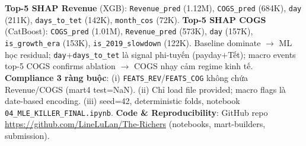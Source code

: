 \documentclass{article}
\begin{document}
\textbf{Top-5 SHAP Revenue} (XGB): \texttt{Revenue\_pred} (1.12M), \texttt{COGS\_pred} (684K), \texttt{day} (211K), \texttt{days\_to\_tet} (142K), \texttt{month\_cos} (72K). \textbf{Top-5 SHAP COGS} (CatBoost): \texttt{COGS\_pred} (1.01M), \texttt{Revenue\_pred} (573K), \texttt{day} (157K), \texttt{is\_growth\_era} (153K), \texttt{is\_2019\_slowdown} (122K). Baseline dominate $\to$ ML học residual; \texttt{day}+\texttt{days\_to\_tet} là signal phi-tuyến (payday+Tết); macro events top-5 COGS confirms ablation $\to$ COGS nhạy cảm regime kinh tế. \textbf{Compliance 3 ràng buộc}: (i) \texttt{FEATS\_REV}/\texttt{FEATS\_COG} không chứa Revenue/COGS (mart4 test=NaN). (ii) Chỉ load file provided; macro flags là date-based encoding. (iii) seed=42, deterministic folds, notebook \texttt{04\_MLE\_KILLER\_FINAL.ipynb}. \textbf{Code \& Reproducibility}: GitHub repo \url{https://github.com/LineLuLan/The-Richers} (notebooks, mart-builders, submission).
\end{document}
